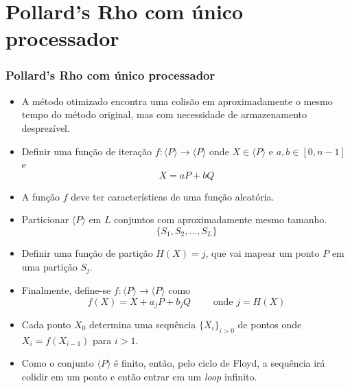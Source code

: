 \documentclass{beamer}
\begin{document}
\section{Pollard's Rho com único processador}
\begin{frame}
  \frametitle{Pollard's Rho com único processador}
  \begin{itemize}
    \item A método otimizado encontra uma colisão em aproximadamente o mesmo tempo do método original, mas com necessidade de armazenamento desprezível.
    \item Definir uma função de iteração $f: \langle P \rangle \to \langle P \rangle$ onde $X \in \langle P \rangle$ e $a,b \in [0,n-1]$ e
    $$
      X = aP + bQ
    $$
    \item A função $f$ deve ter características de uma função aleatória.
    \item Particionar $\langle P \rangle$ em $L$ conjuntos com aproximadamente mesmo tamanho.
    $$
      \{S_1, S_2, \dots, S_L\}
    $$
  \end{itemize}
\end{frame}
\begin{frame}
  \begin{itemize}
    \item Definir uma função de partição $H(X) = j$, que vai mapear um ponto $P$ em uma partição $S_j$.
    \item Finalmente, define-se $f: \langle P \rangle \to \langle P \rangle$ como
    $$
      f(X) = X + a_jP + b_jQ \qquad\mbox{ onde } j = H(X)
    $$
    \item Cada ponto $X_0$ determina uma sequência $\{X_i\}_{i>0}$ de pontos onde $X_i = f(X_{i-1})$ para $i>1$.
    \item Como o conjunto $\langle P \rangle$ é finito, então, pelo ciclo de Floyd, a sequência irá colidir em um ponto e então entrar em um \textit{loop} infinito.
  \end{itemize}
\end{frame}
\end{document}
